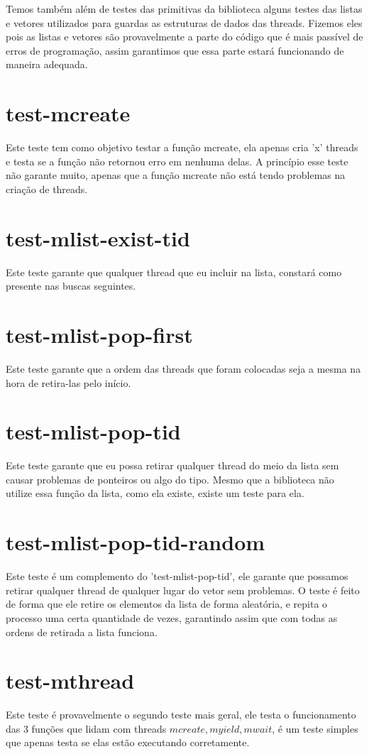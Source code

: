 \documentclass[12pt,a4paper]{report}
\begin{document}
	Temos também além de testes das primitivas da biblioteca alguns testes das listas e vetores utilizados para guardas as estruturas de dados das threads. Fizemos eles pois as listas e vetores são provavelmente a parte do código que é mais passível de erros de programação, assim garantimos que essa parte estará funcionando de maneira adequada.
	
\section{test-mcreate}
	Este teste tem como objetivo testar a função mcreate, ela apenas cria 'x' threads e testa se a função não retornou erro em nenhuma delas. A princípio esse teste não garante muito, apenas que a função mcreate não está tendo problemas na criação de threads.
	
\section{test-mlist-exist-tid}
	Este teste garante que qualquer thread que eu incluir na lista, constará como presente nas buscas seguintes.
	
\section{test-mlist-pop-first}
	Este teste garante que a ordem das threads que foram colocadas seja a mesma na hora de retira-las pelo início.
	
\section{test-mlist-pop-tid}
	Este teste garante que eu possa retirar qualquer thread do meio da lista sem causar problemas de ponteiros ou algo do tipo. Mesmo que a biblioteca não utilize essa função da lista, como ela existe, existe um teste para ela.
	
\section{test-mlist-pop-tid-random}
	Este teste é um complemento do 'test-mlist-pop-tid', ele garante que possamos retirar qualquer thread de qualquer lugar do vetor sem problemas. O teste é feito de forma que ele retire os elementos da lista de forma aleatória, e repita o processo uma certa quantidade de vezes, garantindo assim que com todas as ordens de retirada a lista funciona.
	
\section{test-mthread}
	Este teste é provavelmente o segundo teste mais geral, ele testa o funcionamento das 3 funções que lidam com threads \(mcreate, myield, mwait\), é um teste simples que apenas testa se elas estão executando corretamente.
	
\end{document}
